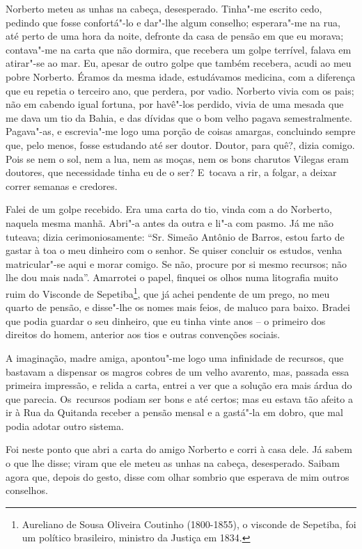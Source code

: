 Norberto meteu as unhas na cabeça, desesperado. Tinha"-me escrito cedo,
pedindo que fosse confortá"-lo e dar"-lhe algum conselho; esperara"-me na
rua, até perto de uma hora da noite, defronte da casa de pensão em que
eu morava; contava"-me na carta que não dormira, que recebera um golpe
terrível, falava em atirar"-se ao mar. Eu, apesar de outro golpe que
também recebera, acudi ao meu pobre Norberto. Éramos da mesma idade,
estudávamos medicina, com a diferença que eu repetia o terceiro ano, que
perdera, por vadio. Norberto vivia com os pais; não em cabendo igual
fortuna, por havê"-los perdido, vivia de uma mesada que me dava um tio da
Bahia, e das dívidas que o bom velho pagava semestralmente. Pagava"-as, e
escrevia"-me logo uma porção de coisas amargas, concluindo sempre que,
pelo menos, fosse estudando até ser doutor. Doutor, para quê?, dizia
comigo. Pois se nem o sol, nem a lua, nem as moças, nem os bons charutos
Vilegas eram doutores, que necessidade tinha eu de o ser? E~tocava a
rir, a folgar, a deixar correr semanas e credores.

Falei de um golpe recebido. Era uma carta do tio, vinda com a do
Norberto, naquela mesma manhã. Abri"-a antes da outra e li"-a com pasmo.
Já me não tuteava; dizia cerimoniosamente: ``Sr. Simeão Antônio de
Barros, estou farto de gastar à toa o meu dinheiro com o senhor. Se
quiser concluir os estudos, venha matricular"-se aqui e morar comigo. Se
não, procure por si mesmo recursos; não lhe dou mais nada''. Amarrotei o
papel, finquei os olhos numa litografia muito ruim do Visconde de
Sepetiba\footnote{Aureliano de Sousa Oliveira Coutinho (1800-1855), o
  visconde de Sepetiba, foi um político brasileiro, ministro da Justiça
  em 1834.}, que já achei pendente de um prego, no meu quarto de pensão,
e disse"-lhe os nomes mais feios, de maluco para baixo. Bradei que podia
guardar o seu dinheiro, que eu tinha vinte anos -- o primeiro dos
direitos do homem, anterior aos tios e outras convenções sociais.

A imaginação, madre amiga, apontou"-me logo uma infinidade de recursos,
que bastavam a dispensar os magros cobres de um velho avarento, mas,
passada essa primeira impressão, e relida a carta, entrei a ver que a
solução era mais árdua do que parecia. Os~recursos podiam ser bons e até
certos; mas eu estava tão afeito a ir à Rua da Quitanda receber a pensão
mensal e a gastá"-la em dobro, que mal podia adotar outro sistema.

Foi neste ponto que abri a carta do amigo Norberto e corri à casa dele.
Já sabem o que lhe disse; viram que ele meteu as unhas na cabeça,
desesperado. Saibam agora que, depois do gesto, disse com olhar sombrio
que esperava de mim outros conselhos.


